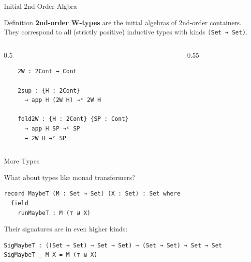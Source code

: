 \documentclass{beamer}
\begin{document}
\begin{frame}[fragile]{Initial 2nd-Order Algbra}

\begin{block}{Definition}
\textbf{2nd-order W-types} are the initial algebras of 2nd-order containers. They correspond to all (strictly positive) inductive types with kinds \texttt{(Set → Set)}.
\end{block}

\begin{exampleblock}{}
  \begin{columns}
    \begin{column}{0.5\textwidth}
    \begin{verbatim}  
    2W : 2Cont → Cont

    2sup : {H : 2Cont} 
      → app H (2W H) →ᶜ 2W H

    fold2W : {H : 2Cont} {SP : Cont}
      → app H SP →ᶜ SP
      → 2W H →ᶜ SP
    \end{verbatim}
    \end{column}

    \begin{column}{0.55\textwidth}
    \end{column}
  \end{columns}
\end{exampleblock}
\end{frame}

\begin{frame}[fragile]{More Types}

What about types like monad transformers?

\begin{exampleblock}{}
\begin{verbatim}
record MaybeT (M : Set → Set) (X : Set) : Set where
  field
    runMaybeT : M (⊤ ⊎ X)
\end{verbatim}
\end{exampleblock}

Their signatures are in even higher kinds:

\begin{exampleblock}{}
\begin{verbatim}
SigMaybeT : ((Set → Set) → Set → Set) → (Set → Set) → Set → Set
SigMaybeT _ M X = M (⊤ ⊎ X)
\end{verbatim}
\end{exampleblock}
\end{frame}
\end{document}
